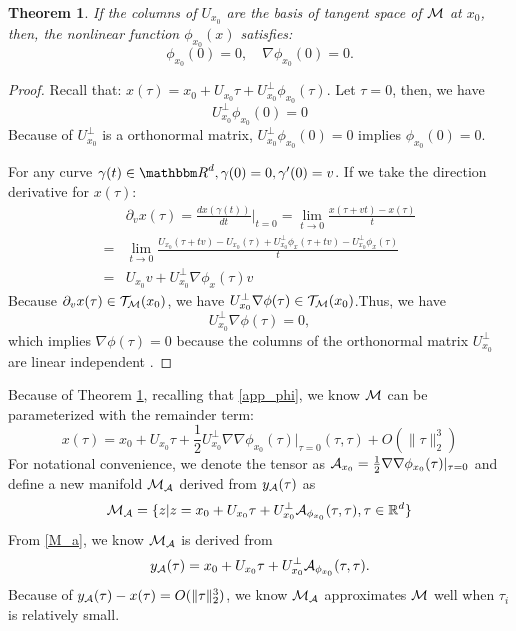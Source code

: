 \documentclass[aos,preprint]{imsart}
\newtheorem{theorem}{Theorem}[section]
\theoremstyle{remark}
\begin{document}
\begin{theorem}\label{tangent property}
If the columns of $U_{x_0}$ are the basis of tangent space of $\cal M$ at $x_0$, then, the nonlinear function $\phi_{x_0}(x)$ satisfies:
\[
\phi_{x_0}(0) = 0,\quad \nabla {\phi_{x_0}}(0) = 0.
\]
\end{theorem}
\begin{proof}
Recall that: $x (\tau)=  x_0 + U_{x_0} \tau+ U_{x_0}^{\perp} \phi_{x_0} (\tau)$. Let $\tau = 0$, then, we have
\[
U_{x_0}^{\perp} \phi_{x_0} (0) = 0
\]
Because of $U_{x_0}^{\perp}$ is a orthonormal matrix, $U_{x_0}^{\perp} \phi_{x_0} (0) = 0$ implies $\phi_{x_0} (0)=0$.

For any curve $\gamma(t)\in {\mathbbm R}^d, \gamma(0) = 0, \gamma'(0)=v$.
If we take the direction derivative for $x(\tau)$:
\[
\begin{aligned}
&\partial_v x(\tau)   = \frac{d x(\gamma(t))}{dt}|_{t=0} = \lim_{t\rightarrow 0} \frac{x(\tau+vt)-x(\tau)}{t}\\
=& \lim_{t\rightarrow 0} \frac{U_{x_0}(\tau+tv) -U_{x_0}(\tau)+U_{x_0}^{\perp} \phi_x(\tau+tv)-U_{x_0}^{\perp} \phi_x(\tau)}{t}\\
=&U_{x_0} v + U_{x_0}^{\perp} \nabla{\phi_x}(\tau) v
\end{aligned}
\]
Because  $\partial_v x(\tau)\in {\cal T}_{\cal M}({x_0})$, we have $U_{x_0}^{\perp} \nabla{\phi} (\tau)\in {\cal T}_{\cal M}({x_0})$.Thus, we have
\[
U_{x_0}^{\perp} \nabla {\phi} (\tau)= 0,
\]
which implies $ \nabla {\phi} (\tau)=0$ because the columns of the orthonormal matrix $U_{x_0}^{\perp}$ are linear independent .
\end{proof}
Because of Theorem \ref{tangent property}, recalling that \eqref{app_phi}, we know $\cal M$ can be parameterized with the remainder term:
\[
 x(\tau)= x_0+ U_{x_0} \tau + \frac{1}{2} U_{x_0}^{\perp}{\nabla\nabla\phi_{x_0}(\tau)|_{\tau=0}}(\tau, \tau)+O(\|\tau\|_2^3)
\]
For notational convenience, we denote the tensor as ${\cal A}_{x_0}=\frac{1}{2} {\nabla\nabla\phi_{x_0}(\tau)|_{\tau=0}}$ and define a new manifold ${\cal M_A}$ derived from $y_{\cal A}(\tau)$ as
\begin{equation}\label{M_a}
{\cal M_A} = \{ z| z =  x_0+ U_{x_0} \tau + U_{x_0}^{\perp} {\cal A}_{\phi_{x_0}}(\tau, \tau), \tau \in {\mathbb R}^d\}
\end{equation}
From \eqref{M_a}, we know ${\cal M_A}$ is derived from 
\[
y_{\cal A}(\tau) = x_0+ U_{x_0} \tau + U_{x_0}^{\perp} {\cal A}_{\phi_{x_0}}(\tau, \tau).
\]
Because of $y_{\cal A}(\tau)-x(\tau) = O(\|\tau\|_2^3)$, we know ${\cal M_A}$ approximates $\cal M$ well when $\tau_i$ is relatively small.
\end{document}
